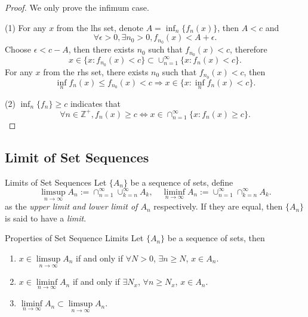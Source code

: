 \begin{proof}
  We only prove the infimum case.

  (1) For any $x$ from the lhs set, denote $A = \inf_n \{f_n(x)\}$, then
  $A < c$ and
  \begin{equation}
    \forall \epsilon > 0, \exists n_0 > 0,
    f_{n_0}(x) < A + \epsilon.
  \end{equation}
  Choose $\epsilon < c - A$, then there exists $n_0$ such that $f_{n_0}(x) < c$,
  therefore
  \begin{equation}
    x \in \{x: f_{n_0}(x) < c\} \subset \cup _{n = 1}^{\infty} \{x: f_n(x) < c\}.
  \end{equation}
  For any $x$ from the rhs set, there exists $n_0$ such that $f_{n_0}(x) < c$, then
  \begin{equation}
    \inf_n f_n(x) \leq f_{n_0}(x) < c \Rightarrow x \in \{x: \inf_n f_n(x) < c\}.
  \end{equation}

  (2) $\inf_n \{f_n\} \geq c$ indicates that
  \begin{equation}
    \forall n \in \mathbb{Z}^+, f_n(x) \geq c
    \Leftrightarrow x \in \cap_{n = 1}^{\infty} \{x: f_n(x) \geq c\}.
  \end{equation}
\end{proof}

\subsection{Limit of Set Sequences}

\begin{definition}{Limits of Set Sequences}{}
  Let $\{A_n\}$ be a sequence of sets,
  define
  \begin{equation}
    \limsup \limits_{n \rightarrow \infty} A_n := \cap _{n = 1}^{\infty}
    \cup _{k = n} ^{\infty} A_k, \quad
    \liminf \limits_{n \rightarrow \infty} A_n := \cup _{n = 1}^{\infty}
    \cap _{k = n}^{\infty}A_k.
  \end{equation}
  as the \emph{upper limit and lower limit of $A_n$} respectively.
  If they are equal, then $\{A_n\}$ is said to have a \emph{limit}.
\end{definition}

\begin{proposition}{Properties of Set Sequence Limits}{}
  Let $\{A_n\}$ be a sequence of sets, then
  \begin{enumerate}
  \item $x \in \limsup \limits_{n \rightarrow \infty} A_n$ if and only if
    $\forall N > 0$, $\exists n \geq N$, $x \in A_n$.
  \item $x \in \liminf \limits_{n \rightarrow \infty} A_n$ if and only if
    $\exists N_x$, $\forall n \geq N_x$, $x \in A_n$.
  \item $\liminf \limits_{n \rightarrow \infty} A_n \subset \limsup \limits_{n
      \rightarrow \infty} A_n$.
  \end{enumerate}
\end{proposition}

